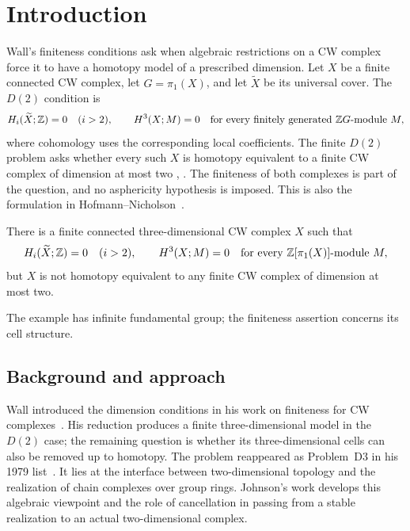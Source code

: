 \section{Introduction}\label{sec:introduction}

Wall's finiteness conditions ask when algebraic restrictions on a CW
complex force it to have a homotopy model of a prescribed dimension.
Let $X$ be a finite connected CW complex, let $G=\pi_1(X)$, and let
$\widetilde X$ be its universal cover. The $D(2)$ condition is
\begin{equation}\label{eq:d2-condition}
 H_i(\widetilde X;\mathbb Z)=0\quad(i>2),\qquad
 H^3(X;M)=0\quad\text{for every finitely generated }\mathbb Z G\text{-module }M,
\end{equation}
where cohomology uses the corresponding local coefficients.
The finite $D(2)$ problem asks whether every such $X$ is homotopy
equivalent to a finite CW complex of dimension at most two
\cite[Section~2]{Wall65}, \cite[Problem~D3]{Wall79}.
The finiteness of both complexes is part of the question, and no
asphericity hypothesis is imposed. This is also the formulation in
Hofmann--Nicholson~\cite[p.~254]{HofmannNicholson27}.

\begin{theorem}\label{thm:main}
There is a finite connected three-dimensional CW complex $X$ such that
\[
 H_i(\widetilde X;\mathbb Z)=0\quad(i>2),\qquad
 H^3(X;M)=0\quad\text{for every }\mathbb Z[\pi_1(X)]\text{-module }M,
\]
but $X$ is not homotopy equivalent to any finite CW complex of
dimension at most two.
\end{theorem}

The example has infinite fundamental group; the finiteness assertion
concerns its cell structure.

\subsection{Background and approach}

Wall introduced the dimension conditions in his work on finiteness
for CW complexes~\cite{Wall65}. His reduction produces a finite
three-dimensional model in the $D(2)$ case; the remaining question is
whether its three-dimensional cells can also be removed up to homotopy.
The problem reappeared as Problem~D3 in his 1979 list~\cite{Wall79}.
It lies at the interface between two-dimensional topology and the
realization of chain complexes over group rings. Johnson's work
\cite{Johnson03} develops this algebraic viewpoint and the role of
cancellation in passing from a stable realization to an actual
two-dimensional complex.

